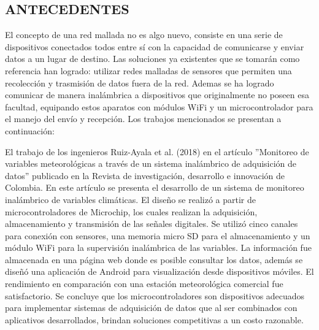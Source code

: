 \documentclass[12pt,letterpaper]{article}
\begin{document}
 \newpage


 \begin{center}
 	\section*{ANTECEDENTES}
 \end{center}

\vspace{1cm}

El concepto de una red mallada no es algo nuevo, consiste en una serie de dispositivos conectados todos entre sí con la capacidad de comunicarse y enviar datos a un lugar de destino. Las soluciones ya existentes que se tomarán como referencia han logrado: utilizar redes malladas de sensores que permiten una recolección y trasmisión de datos fuera de la red. Ademas se ha logrado comunicar de manera inalámbrica a dispositivos que originalmente no poseen esa facultad, equipando estos aparatos con módulos WiFi y un microcontrolador para el manejo del envío y recepción. Los trabajos mencionados se presentan a continuación:

El trabajo de los ingenieros Ruiz-Ayala et al. (2018) en el artículo ”Monitoreo de variables meteorológicas a través de un sistema inalámbrico de adquisición de datos” publicado en la Revista de investigación, desarrollo e innovación de Colombia. En este artículo se presenta el desarrollo de un sistema de monitoreo inalámbrico de variables climáticas. El diseño se realizó a partir de microcontroladores de Microchip, los cuales realizan la adquisición, almacenamiento y transmisión de las señales digitales. Se utilizó cinco canales para conexión con sensores, una memoria micro SD para el almacenamiento y un módulo WiFi para la supervisión inalámbrica de las variables. La información fue almacenada en una página web donde es posible consultar los datos, además se diseñó una aplicación de Android para visualización desde dispositivos móviles. El rendimiento en comparación con una estación meteorológica comercial fue satisfactorio. Se concluye que los microcontroladores son dispositivos adecuados para implementar sistemas de adquisición de datos que al ser combinados con aplicativos desarrollados, brindan soluciones competitivas a un costo razonable.
\end{document}
